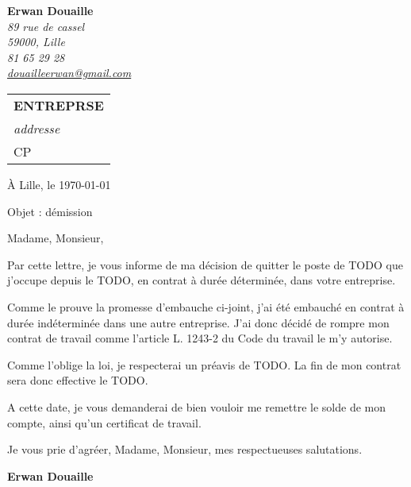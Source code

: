 \documentclass[11pt]{letter}
\begin{document}
\sffamily
\hfill

\vspace{-2.5cm}
\begin{flushleft}
{\bfseries Erwan Douaille}\\[.35ex]
\small\itshape
89 rue de cassel \\
59000, Lille\\[.35ex]
 81 65 29 28\\
\Letter 	\href{mailto:douailleerwan@gmail.com}{douailleerwan@gmail.com}
\end{flushleft}


\begin{flushright}
\begin{tabular}{l}
{\bfseries ENTREPRSE }\\[.35ex]
\small\itshape
addresse \\
CP
\end{tabular}
\end{flushright}

\begin{flushright}
\`A Lille, le \today \\
\end{flushright}

\begin{flushleft}
Objet : démission
\end{flushleft}

Madame, Monsieur,

Par cette lettre, je vous informe de ma décision de quitter le poste de TODO que j’occupe depuis le TODO, en contrat à durée déterminée, dans votre entreprise.

Comme le prouve la promesse d'embauche ci-joint, j'ai été embauché en contrat à durée indéterminée dans une autre entreprise. J'ai donc décidé de rompre mon contrat de travail comme l'article L. 1243-2 du Code du travail le m'y autorise. 

Comme l’oblige la loi, je respecterai un préavis de TODO. La fin de mon contrat sera donc effective le TODO.

A cette date, je vous demanderai de bien vouloir me remettre le solde de mon compte, ainsi qu’un certificat de travail.
 
Je vous prie d’agréer, Madame, Monsieur, mes respectueuses salutations.



\begin{flushright}
{\bfseries Erwan Douaille}\\
\end{flushright}

\vfill
\end{document}
